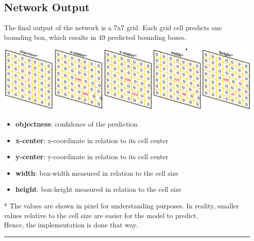\documentclass[landscape,a2,final,12pt]{issposter}
\begin{document}
\begin{multicols}{3}
\section{Network Output}
    \begin{small}
        The final output of the network is a 7x7 grid. Each grid cell predicts one bounding box, which results in 49 predicted bounding boxes.
    \end{small}
    \begin{center}
        \includegraphics[scale=0.55]{3_channels.png}
    \end{center}
    \begin{small}
        \begin{itemize}
            \item {\textbf{objectness}: confidence of the prediction}
            \item {\textbf{x-center}: x-coordinate in relation to its cell center}
            \item {\textbf{y-center}: y-coordinate in relation to its cell center}
            \item {\textbf{width}: box-width measured in relation to the cell size}
            \item {\textbf{height}: box-height measured in relation to the cell size}
        \end{itemize}
    \end{small}
    \begin{footnotesize}
        * The values are shown in pixel for understanding purposes. In reality, smaller values relative to the cell size are easier for the model to predict. \\Hence, the implementation is done that way.
    \end{footnotesize}
    
\end{multicols}


\rule{\textwidth}{8pt}
\end{document}
